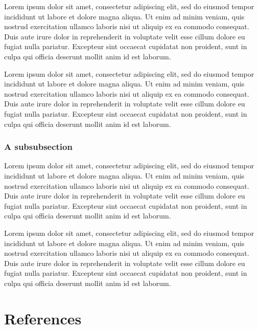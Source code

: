 \documentclass[
  a4paper,
  twoside]{article}
\begin{document}
Lorem ipsum dolor sit amet, consectetur adipiscing elit, sed do eiusmod tempor incididunt ut labore et dolore magna aliqua. Ut enim ad minim veniam, quis nostrud exercitation ullamco laboris nisi ut aliquip ex ea commodo consequat. Duis aute irure dolor in reprehenderit in voluptate velit esse cillum dolore eu fugiat nulla pariatur. Excepteur sint occaecat cupidatat non proident, sunt in culpa qui officia deserunt mollit anim id est laborum.

Lorem ipsum dolor sit amet, consectetur adipiscing elit, sed do eiusmod tempor incididunt ut labore et dolore magna aliqua. Ut enim ad minim veniam, quis nostrud exercitation ullamco laboris nisi ut aliquip ex ea commodo consequat. Duis aute irure dolor in reprehenderit in voluptate velit esse cillum dolore eu fugiat nulla pariatur. Excepteur sint occaecat cupidatat non proident, sunt in culpa qui officia deserunt mollit anim id est laborum.

\subsubsection{A subsubsection}\label{a-subsubsection}

Lorem ipsum dolor sit amet, consectetur adipiscing elit, sed do eiusmod tempor incididunt ut labore et dolore magna aliqua. Ut enim ad minim veniam, quis nostrud exercitation ullamco laboris nisi ut aliquip ex ea commodo consequat. Duis aute irure dolor in reprehenderit in voluptate velit esse cillum dolore eu fugiat nulla pariatur. Excepteur sint occaecat cupidatat non proident, sunt in culpa qui officia deserunt mollit anim id est laborum.

Lorem ipsum dolor sit amet, consectetur adipiscing elit, sed do eiusmod tempor incididunt ut labore et dolore magna aliqua. Ut enim ad minim veniam, quis nostrud exercitation ullamco laboris nisi ut aliquip ex ea commodo consequat. Duis aute irure dolor in reprehenderit in voluptate velit esse cillum dolore eu fugiat nulla pariatur. Excepteur sint occaecat cupidatat non proident, sunt in culpa qui officia deserunt mollit anim id est laborum.

\newpage

\section*{References}\label{references}
\end{document}
